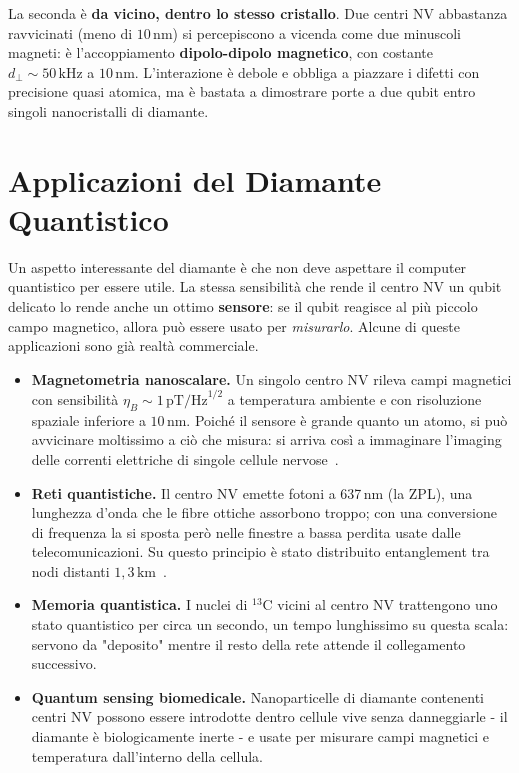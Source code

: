 La seconda è \textbf{da vicino, dentro lo stesso cristallo}. Due centri NV
abbastanza ravvicinati (meno di $10\,\text{nm}$) si percepiscono a vicenda come
due minuscoli magneti: è l'accoppiamento \textbf{dipolo-dipolo magnetico}, con
costante $d_\perp \sim 50\,\text{kHz}$ a $10\,\text{nm}$. L'interazione è debole
e obbliga a piazzare i difetti con precisione quasi atomica, ma è bastata a
dimostrare porte a due qubit entro singoli nanocristalli di diamante.

\section{Applicazioni del Diamante Quantistico}
\label{sec:nv-applicazioni}

Un aspetto interessante del diamante è che non deve aspettare il computer
quantistico per essere utile. La stessa sensibilità che rende il centro NV un
qubit delicato lo rende anche un ottimo \textbf{sensore}: se il qubit reagisce
al più piccolo campo magnetico, allora può essere usato per \textit{misurarlo}.
Alcune di queste applicazioni sono già realtà commerciale.

\begin{itemize}
  \item \textbf{Magnetometria nanoscalare.} Un singolo centro NV rileva campi
    magnetici con sensibilità $\eta_B \sim 1\,\text{pT/Hz}^{1/2}$ a temperatura
    ambiente e con risoluzione spaziale inferiore a $10\,\text{nm}$. Poiché il
    sensore è grande quanto un atomo, si può avvicinare moltissimo a ciò che
    misura: si arriva così a immaginare l'imaging delle correnti elettriche di
    singole cellule nervose~\cite{degen2017quantum}.

  \item \textbf{Reti quantistiche.} Il centro NV emette fotoni a 637\,nm (la
    ZPL), una lunghezza d'onda che le fibre ottiche assorbono troppo; con una
    conversione di frequenza la si sposta però nelle finestre a bassa perdita
    usate dalle telecomunicazioni. Su questo principio è stato distribuito
    entanglement tra nodi distanti $1,3\,\text{km}$~\cite{hensen2015loophole}.

  \item \textbf{Memoria quantistica.} I nuclei di $^{13}$C vicini al centro NV
    trattengono uno stato quantistico per circa un secondo, un tempo lunghissimo
    su questa scala: servono da "deposito" mentre il resto della rete attende
    il collegamento successivo.

  \item \textbf{Quantum sensing biomedicale.} Nanoparticelle di diamante
    contenenti centri NV possono essere introdotte dentro cellule vive senza
    danneggiarle - il diamante è biologicamente inerte - e usate per misurare
    campi magnetici e temperatura dall'interno della cellula.
\end{itemize}

